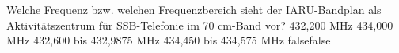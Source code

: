     {Welche Frequenz bzw. welchen Frequenzbereich sieht der IARU-Bandplan als Aktivitätszentrum für SSB-Telefonie im 70 cm-Band vor?}
    {432,200 MHz}
    {434,000 MHz}
    {432,600 bis 432,9875 MHz}
    {434,450 bis 434,575 MHz}
    {false}{false}